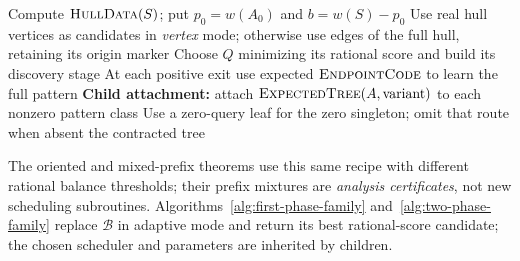 \begin{algorithm}[H]
\caption{\ExpectedTree: shared recursive expected-depth construction}
\label{alg:expected-tree}
Compute $\textnormal{\textsc{HullData}}(S)$; put $p_0=w(A_0)$ and $b=w(S)-p_0$\;
Use real hull vertices as candidates in \emph{vertex} mode;
otherwise use edges of the full hull, retaining its origin marker\;
Choose $Q$ minimizing its rational score and build its discovery stage\;
At each positive exit use expected $\textnormal{\textsc{EndpointCode}}$ to learn the full pattern\;
\textbf{Child attachment:} attach $\textnormal{\textsc{ExpectedTree}}(A,\text{variant})$ to each nonzero pattern class\;
Use a zero-query leaf for the zero singleton; omit that route when absent\;
\KwRet the contracted tree\;
\end{algorithm}

The oriented and mixed-prefix theorems use this same recipe with
different rational balance thresholds; their prefix mixtures are
\emph{analysis certificates}, not new scheduling subroutines.
Algorithms~\ref{alg:first-phase-family} and~\ref{alg:two-phase-family}
replace $\mathcal B$ in adaptive mode and return its best rational-score
candidate; the chosen scheduler and parameters are inherited by children.
